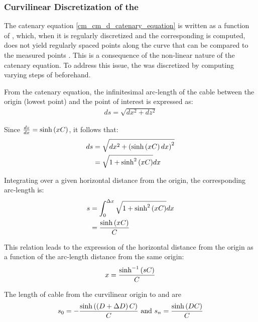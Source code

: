 \subsubsection{Curvilinear Discretization of the \catenarymodeltitle{}}
\label{cm_acm_ev_curvilinear_discretization_of_the_catenary_model}

The catenary equation \cref{cm_cm_d_catenary_equation} is written as a function of ,
which, when it is regularly discretized and the corresponding  is computed, does not
yield regularly spaced points along the curve that can be compared to the measured points
. This is a consequence of the non-linear nature of the catenary equation. To
address this issue, the \thetagammamodel{} was discretized by computing varying steps of
 beforehand.

From the catenary equation, the infinitesimal arc-length  of the cable between the origin
(lowest point) and the point of interest is expressed as:
\begin{align}
	ds = \sqrt{dx^2 + dz^2}
\end{align}

Since $\frac{dz}{dx} = \sinh\left(xC\right)$, it follows that:
\begin{align}
	ds & = \sqrt{dx^2 + \left(\sinh\left(xC\right) dx\right)^2} \\
	   & = \sqrt{1 + \sinh^2\left(xC\right)} dx
\end{align}

Integrating over a given horizontal distance  from the origin, the corresponding arc-length
 is:
\begin{align}
	s & = \int_{0}^{\Delta x} \sqrt{1 + \sinh^2\left(xC\right)} dx \\
	  & = \frac{\sinh\left(x C\right)}{C}
\end{align}

This relation leads to the expression of the horizontal distance from the origin  as a
function of the arc-length distance  from the same origin:
\begin{align}
	x = \frac{\sinh^{-1}\left(s C\right)}{C}
	\label{cm_acm_ev_cdotcm_equation}
\end{align}

The length of cable from the curvilinear origin to  and
 are
\begin{align}
	{s}_{0} = -\frac{\sinh{\left(\left(\ensuremath{D}{} + \ensuremath{\Delta D}\right)\ensuremath{C}{}\right)}}{C{}} \text{ and } {s}_{n} = \frac{\sinh{\left(\ensuremath{D}{}\ensuremath{C}{}\right)}}{C{}}
\end{align}

